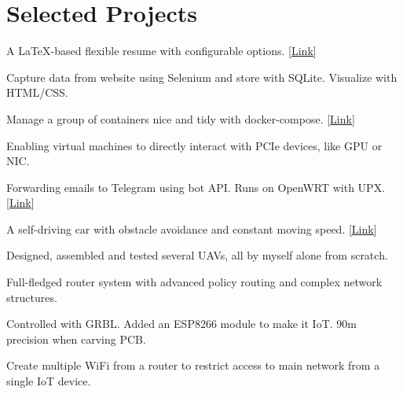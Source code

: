 \documentclass[letterpaper,11pt]{article}
\newcommand{\resumeSubHeadingListStart}{\begin{itemize}[leftmargin=0pt,label={}]}
\newcommand{\resumeSubHeadingListEnd}{\end{itemize}}
\begin{document}
\section{Selected Projects}{
    \resumeSubHeadingListStart
        {A \LaTeX-based flexible resume with configurable options. [\href{https://github.com/ly4096x/Flexible_Resume}{\underline{Link}}]}{}

        {Capture data from website using Selenium and store with SQLite. Visualize with HTML/CSS.}{}

        {Manage a group of containers nice and tidy with docker-compose. [\href{https://github.com/ly4096x/ECE6383_HSN_Lab4_Network}{\underline{Link}}]}{}

        {Enabling virtual machines to directly interact with PCIe devices, like GPU or NIC.}{}

        {Forwarding emails to Telegram using bot API. Runs on OpenWRT with UPX. [\href{https://github.com/ly4096x/smtp_to_telegram}{\underline{Link}}]}{}

        {A self-driving car with obstacle avoidance and constant moving speed. [\href{https://github.com/ly4096x/RTES_STM32F4}{\underline{Link}}]}{}

        {Designed, assembled and tested several UAVs, all by myself alone from scratch.}{}

        {Full-fledged router system with advanced policy routing and complex network structures.}{}

        {Controlled with GRBL. Added an ESP8266 module to make it IoT. 90{\textmu}m precision when carving PCB.}{}

        {Create multiple WiFi from a router to restrict access to main network from a single IoT device.}{}
    \resumeSubHeadingListEnd
}
\fi

\end{document}
